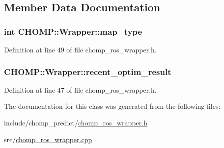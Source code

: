 \subsection{Member Data Documentation}
\subsubsection[{\texorpdfstring{map\+\_\+type}{map_type}}]{\setlength{\rightskip}{0pt plus 5cm}int C\+H\+O\+M\+P\+::\+Wrapper\+::map\+\_\+type}\hypertarget{class_c_h_o_m_p_1_1_wrapper_a8e7d4dd9f8678e2752ef05e55a36ffe1}{}\label{class_c_h_o_m_p_1_1_wrapper_a8e7d4dd9f8678e2752ef05e55a36ffe1}


Definition at line 49 of file chomp\+\_\+ros\+\_\+wrapper.\+h.

\subsubsection[{\texorpdfstring{recent\+\_\+optim\+\_\+result}{recent_optim_result}}]{ C\+H\+O\+M\+P\+::\+Wrapper\+::recent\+\_\+optim\+\_\+result}\hypertarget{class_c_h_o_m_p_1_1_wrapper_a5b349bddf6965d721705e451601687a7}{}\label{class_c_h_o_m_p_1_1_wrapper_a5b349bddf6965d721705e451601687a7}


Definition at line 47 of file chomp\+\_\+ros\+\_\+wrapper.\+h.



The documentation for this class was generated from the following files\+:\begin{DoxyCompactItemize}
\item 
include/chomp\+\_\+predict/\hyperlink{chomp__ros__wrapper_8h}{chomp\+\_\+ros\+\_\+wrapper.\+h}\item 
src/\hyperlink{chomp__ros__wrapper_8cpp}{chomp\+\_\+ros\+\_\+wrapper.\+cpp}\end{DoxyCompactItemize}
